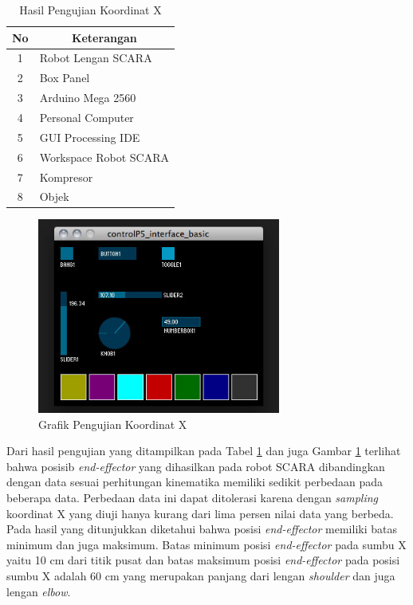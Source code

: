  \begin{table}[H]
 	\centering
 	\caption{Hasil Pengujian Koordinat X}
 	\label{tbl.koordinatx}
 	\begin{tabular}{|c|l|}
 		\hline
 		\rowcolor[HTML]{9B9B9B} 
 		
 		No & \multicolumn{1}{c|}{\cellcolor[HTML]{9B9B9B}Keterangan} \\ \hline
 		1  & Robot Lengan SCARA                                      \\ \hline
 		2  & Box Panel                                               \\ \hline
 		3  & Arduino Mega 2560                                       \\ \hline
 		4  & Personal Computer                                       \\ \hline
 		5  & GUI Processing IDE                                      \\ \hline
 		6  & Workspace Robot SCARA                                   \\ \hline
 		7  & Kompresor                                               \\ \hline
 		8  & Objek                                                   \\ \hline
 	\end{tabular}
 	
 \end{table} 
	\begin{figure}[H]
	\centering
	\includegraphics[width=8cm]{gambar/controlp5.jpg}
	\caption{Grafik Pengujian Koordinat X}
	\label{pic.koordinatx}
\end{figure}

Dari hasil pengujian yang ditampilkan pada Tabel \ref{tbl.koordinatx} dan juga Gambar \ref{pic.koordinatx} terlihat bahwa posisib \textit{end-effector} yang dihasilkan pada robot SCARA dibandingkan dengan data sesuai perhitungan kinematika memiliki sedikit perbedaan pada beberapa data. Perbedaan data ini dapat ditolerasi karena dengan \textit{sampling} koordinat X yang diuji hanya kurang dari lima persen nilai data yang berbeda. Pada hasil yang ditunjukkan diketahui bahwa posisi \textit{end-effector} memiliki batas minimum dan juga maksimum. Batas minimum posisi \textit{end-effector} pada sumbu X yaitu 10 cm dari titik pusat dan batas maksimum posisi \textit{end-effector} pada posisi sumbu X adalah 60 cm yang merupakan panjang dari lengan \textit{shoulder} dan juga lengan \textit{elbow}. 

